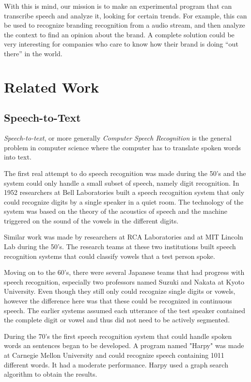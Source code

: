 \documentclass[a4paper,12pt,twoside]{ltxdoc}
\begin{document}
With this is mind, our mission is to make an experimental program that can transcribe speech and analyze it, looking for certain trends.
For example, this can be used to recognize branding recognition from a audio stream, and then analyze the context to find an opinion about the brand.
A complete solution could be very interesting for companies who care to know how their brand is doing ``out there'' in the world.

\section{Related Work}
\subsection{Speech-to-Text}
\emph{Speech-to-text}, or more generally \emph{Computer Speech Recognition} is the general problem in computer science where the computer has to translate spoken words into text.

The first real attempt to do speech recognition was made during the 50's and the system could only handle a small subset of speech, namely digit recognition. In 1952 researchers at Bell Laboratories built a speech recognition system that only could recognize digits by a single speaker in a quiet room. The technology of  the system was based on the theory of the acoustics of speech and the machine triggered on the sound of the vowels in the different digits.

Similar work was made by researchers at RCA Laboratories and at MIT Lincoln Lab during the 50's. The research teams at these two institutions built speech recognition systems that could classify vowels that a test person spoke.

Moving on to the 60's, there were several Japanese teams that had progress with speech recognition, especially two professors named Suzuki and Nakata at Kyoto University. Even though they still only could recognize single digits or vowels, however the difference here was that these could be recognized in continuous speech. The earlier systems assumed each utterance of the test speaker contained the complete digit or vowel and thus did not need to be actively segmented.  

During the 70's the first speech recognition system that could handle spoken words an sentences began to be developed. A program named "Harpy" was made at Carnegie Mellon University and could recognize speech containing 1011 different words. It had a moderate performance. Harpy used a graph search algorithm to obtain the results. 
\end{document}
